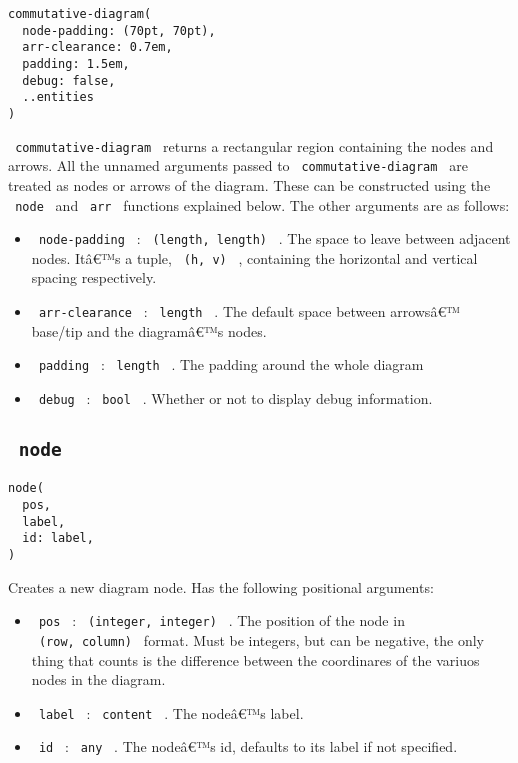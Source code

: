 \begin{verbatim}
commutative-diagram(
  node-padding: (70pt, 70pt),
  arr-clearance: 0.7em,
  padding: 1.5em,
  debug: false,
  ..entities
)
\end{verbatim}

\texttt{\ commutative-diagram\ } returns a rectangular region containing
the nodes and arrows. All the unnamed arguments passed to
\texttt{\ commutative-diagram\ } are treated as nodes or arrows of the
diagram. These can be constructed using the \texttt{\ node\ } and
\texttt{\ arr\ } functions explained below. The other arguments are as
follows:

\begin{itemize}
\tightlist
\item
  \texttt{\ node-padding\ } : \texttt{\ (length,\ length)\ } . The space
  to leave between adjacent nodes. Itâ€™s a tuple, \texttt{\ (h,\ v)\ }
  , containing the horizontal and vertical spacing respectively.
\item
  \texttt{\ arr-clearance\ } : \texttt{\ length\ } . The default space
  between arrowsâ€™ base/tip and the diagramâ€™s nodes.
\item
  \texttt{\ padding\ } : \texttt{\ length\ } . The padding around the
  whole diagram
\item
  \texttt{\ debug\ } : \texttt{\ bool\ } . Whether or not to display
  debug information.
\end{itemize}

\subsection{\texorpdfstring{\texttt{\ node\ }}{ node }}\label{node}

\begin{verbatim}
node(
  pos,
  label,
  id: label,
)
\end{verbatim}

Creates a new diagram node. Has the following positional arguments:

\begin{itemize}
\tightlist
\item
  \texttt{\ pos\ } : \texttt{\ (integer,\ integer)\ } . The position of
  the node in \texttt{\ (row,\ column)\ } format. Must be integers, but
  can be negative, the only thing that counts is the difference between
  the coordinares of the variuos nodes in the diagram.
\item
  \texttt{\ label\ } : \texttt{\ content\ } . The nodeâ€™s label.
\item
  \texttt{\ id\ } : \texttt{\ any\ } . The nodeâ€™s id, defaults to its
  label if not specified.
\end{itemize}

